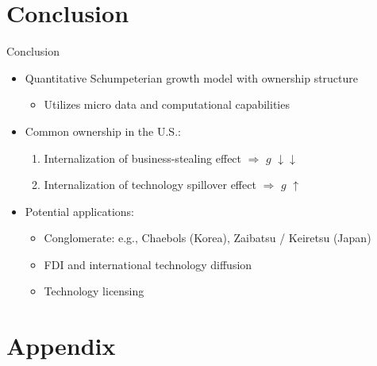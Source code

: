 \documentclass[
  10pt,
  aspectratio=169,   %
]{beamer}
\theoremstyle{plain}
\begin{document}
\section{Conclusion}
\begin{frame}{Conclusion}
  \begin{itemize}
    \item Quantitative Schumpeterian growth model with ownership structure
          \begin{itemize}
            \item Utilizes micro data and computational capabilities
          \end{itemize}
          \medskip{}
    \item Common ownership in the U.S.:
          \begin{enumerate}
            \item Internalization of business-stealing effect $\Longrightarrow$ $g$ $\downarrow\downarrow$
            \item Internalization of technology spillover effect $\Longrightarrow$ $g$ $\uparrow$
          \end{enumerate}
          \medskip{}
    \item Potential applications:
          \begin{itemize}
            \item Conglomerate: e.g., Chaebols (Korea), Zaibatsu / Keiretsu (Japan)
            \item FDI and international technology diffusion
            \item Technology licensing
          \end{itemize}
  \end{itemize}
\end{frame}

\appendix
\section{Appendix}
\end{document}
